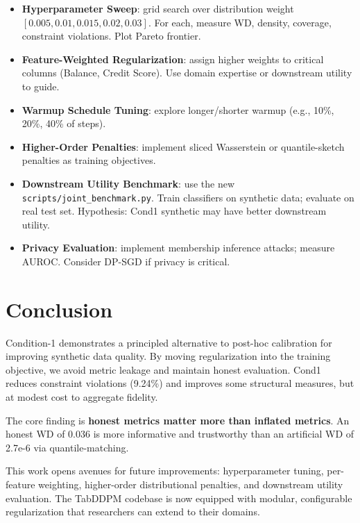 \documentclass{article}
\begin{document}
\begin{itemize}
  \item \textbf{Hyperparameter Sweep}: grid search over distribution weight $[0.005, 0.01, 0.015, 0.02, 0.03]$. For each, measure WD, density, coverage, constraint violations. Plot Pareto frontier.
  
  \item \textbf{Feature-Weighted Regularization}: assign higher weights to critical columns (Balance, Credit Score). Use domain expertise or downstream utility to guide.
  
  \item \textbf{Warmup Schedule Tuning}: explore longer/shorter warmup (e.g., 10\%, 20\%, 40\% of steps).
  
  \item \textbf{Higher-Order Penalties}: implement sliced Wasserstein or quantile-sketch penalties as training objectives.
  
  \item \textbf{Downstream Utility Benchmark}: use the new \texttt{scripts/joint\_benchmark.py}. Train classifiers on synthetic data; evaluate on real test set. Hypothesis: Cond1 synthetic may have better downstream utility.
  
  \item \textbf{Privacy Evaluation}: implement membership inference attacks; measure AUROC. Consider DP-SGD if privacy is critical.
\end{itemize}

\section{Conclusion}

Condition-1 demonstrates a principled alternative to post-hoc calibration for improving synthetic data quality. By moving regularization into the training objective, we avoid metric leakage and maintain honest evaluation. Cond1 reduces constraint violations (9.24\%) and improves some structural measures, but at modest cost to aggregate fidelity.

The core finding is \textbf{honest metrics matter more than inflated metrics}. An honest WD of 0.036 is more informative and trustworthy than an artificial WD of 2.7e-6 via quantile-matching.

This work opens avenues for future improvements: hyperparameter tuning, per-feature weighting, higher-order distributional penalties, and downstream utility evaluation. The TabDDPM codebase is now equipped with modular, configurable regularization that researchers can extend to their domains.
\end{document}

